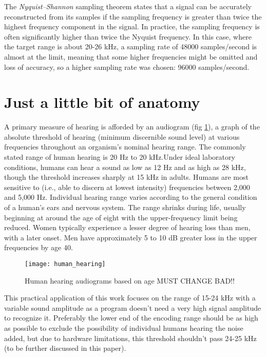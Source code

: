 \documentclass[12pt]{report}
\begin{document}
The \emph{Nyquist–Shannon} sampling theorem states that a signal can be accurately reconstructed from its samples if the sampling frequency is greater than twice the highest frequency component in the signal. In practice, the sampling frequency is often significantly higher than twice the Nyquist frequency\cite{note5}. In this case, where the target range is about 20-26 kHz, a sampling rate of 48000 samples/second is almost at the limit, meaning that some higher frequencies might be omitted and loss of accuracy, so a higher sampling rate was chosen: 96000 samples/second.


\section{Just a little bit of anatomy}
A primary measure of hearing is afforded by an audiogram (fig \ref{fig:human_hearing}), a graph of the absolute threshold of hearing (minimum discernible sound level) at various frequencies throughout an organism's nominal hearing range. The commonly stated range of human hearing is 20 Hz to 20 kHz.Under ideal laboratory conditions, humans can hear a sound as low as 12 Hz and as high as 28 kHz, though the threshold increases sharply at 15 kHz in adults. Humans are most sensitive to (i.e., able to discern at lowest intensity) frequencies between 2,000 and 5,000 Hz. Individual hearing range varies according to the general condition of a human's ears and nervous system. The range shrinks during life, usually beginning at around the age of eight with the upper-frequency limit being reduced. Women typically experience a lesser degree of hearing loss than men, with a later onset. Men have approximately 5 to 10 dB greater loss in the upper frequencies by age 40\cite{note6}.

\begin{figure}[h]
\centering
\texttt{[image: human\_hearing]}
\caption{Human hearing audiograms based on age\cite{note7} MUST CHANGE BAD!!}
\label{fig:human_hearing}
\end{figure}

This practical application of this work focuses on the range of 15-24 kHz with a variable sound amplitude as a program doesn't need a very high signal amplitude to recognize it. Preferably the lower end of the encoding range should be as high as possible to exclude the possibility of individual humans hearing the noise added, but due to hardware limitations, this threshold shouldn't pass 24-25 kHz (to be further discussed in this paper).
\end{document}
